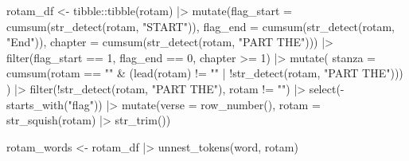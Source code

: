 \documentclass[
  letterpaper,
  DIV=11,
  numbers=noendperiod]{scrreprt}
\newenvironment{Shaded}{\begin{snugshade}}{\end{snugshade}}
\newcommand{\AttributeTok}[1]{\textcolor[rgb]{0.40,0.46,0.14}{#1}}
\newcommand{\DecValTok}[1]{\textcolor[rgb]{0.68,0.00,0.00}{#1}}
\newcommand{\FunctionTok}[1]{\textcolor[rgb]{0.28,0.35,0.67}{#1}}
\newcommand{\NormalTok}[1]{\textcolor[rgb]{0.00,0.46,0.62}{#1}}
\newcommand{\OtherTok}[1]{\textcolor[rgb]{0.00,0.46,0.62}{#1}}
\newcommand{\SpecialCharTok}[1]{\textcolor[rgb]{0.37,0.37,0.37}{#1}}
\newcommand{\StringTok}[1]{\textcolor[rgb]{0.13,0.47,0.30}{#1}}
\begin{document}
\begin{Shaded}
\begin{Highlighting}[]
\NormalTok{rotam\_df }\OtherTok{\textless{}{-}}\NormalTok{ tibble}\SpecialCharTok{::}\FunctionTok{tibble}\NormalTok{(rotam) }\SpecialCharTok{|\textgreater{}} 
    \FunctionTok{mutate}\NormalTok{(}\AttributeTok{flag\_start =} \FunctionTok{cumsum}\NormalTok{(}\FunctionTok{str\_detect}\NormalTok{(rotam, }\StringTok{"START"}\NormalTok{)),}
           \AttributeTok{flag\_end =} \FunctionTok{cumsum}\NormalTok{(}\FunctionTok{str\_detect}\NormalTok{(rotam, }\StringTok{"End"}\NormalTok{)),}
           \AttributeTok{chapter =} \FunctionTok{cumsum}\NormalTok{(}\FunctionTok{str\_detect}\NormalTok{(rotam, }\StringTok{"PART THE"}\NormalTok{))) }\SpecialCharTok{|\textgreater{}} 
    \FunctionTok{filter}\NormalTok{(flag\_start }\SpecialCharTok{==} \DecValTok{1}\NormalTok{, flag\_end }\SpecialCharTok{==} \DecValTok{0}\NormalTok{, chapter }\SpecialCharTok{\textgreater{}=} \DecValTok{1}\NormalTok{) }\SpecialCharTok{|\textgreater{}} 
    \FunctionTok{mutate}\NormalTok{(}
        \AttributeTok{stanza =} \FunctionTok{cumsum}\NormalTok{(rotam }\SpecialCharTok{==} \StringTok{""} \SpecialCharTok{\&}\NormalTok{ (}\FunctionTok{lead}\NormalTok{(rotam) }\SpecialCharTok{!=} \StringTok{""} \SpecialCharTok{|} \SpecialCharTok{!}\FunctionTok{str\_detect}\NormalTok{(rotam, }\StringTok{"PART THE"}\NormalTok{)))}
\NormalTok{    ) }\SpecialCharTok{|\textgreater{}} 
    \FunctionTok{filter}\NormalTok{(}\SpecialCharTok{!}\FunctionTok{str\_detect}\NormalTok{(rotam, }\StringTok{"PART THE"}\NormalTok{), rotam }\SpecialCharTok{!=} \StringTok{""}\NormalTok{) }\SpecialCharTok{|\textgreater{}} 
    \FunctionTok{select}\NormalTok{(}\SpecialCharTok{{-}}\FunctionTok{starts\_with}\NormalTok{(}\StringTok{"flag"}\NormalTok{)) }\SpecialCharTok{|\textgreater{}} 
    \FunctionTok{mutate}\NormalTok{(}\AttributeTok{verse =} \FunctionTok{row\_number}\NormalTok{(), }\AttributeTok{rotam =} \FunctionTok{str\_squish}\NormalTok{(rotam) }\SpecialCharTok{|\textgreater{}} \FunctionTok{str\_trim}\NormalTok{())}

\NormalTok{rotam\_words }\OtherTok{\textless{}{-}}\NormalTok{ rotam\_df }\SpecialCharTok{|\textgreater{}} \FunctionTok{unnest\_tokens}\NormalTok{(word, rotam)}


\end{Highlighting}
\end{Shaded}
\end{document}

